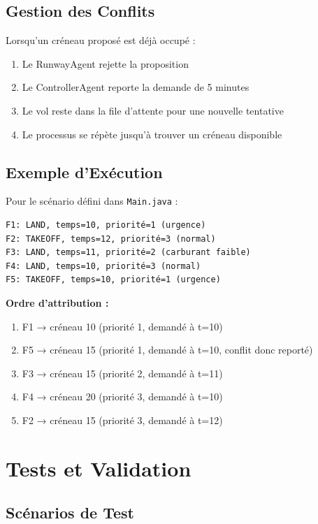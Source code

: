 \documentclass[12pt,a4paper]{article}
\begin{document}
\subsection{Gestion des Conflits}

Lorsqu'un créneau proposé est déjà occupé :
\begin{enumerate}
    \item Le RunwayAgent rejette la proposition
    \item Le ControllerAgent reporte la demande de 5 minutes
    \item Le vol reste dans la file d'attente pour une nouvelle tentative
    \item Le processus se répète jusqu'à trouver un créneau disponible
\end{enumerate}

\subsection{Exemple d'Exécution}

Pour le scénario défini dans \texttt{Main.java} :

\begin{verbatim}
F1: LAND, temps=10, priorité=1 (urgence)
F2: TAKEOFF, temps=12, priorité=3 (normal)
F3: LAND, temps=11, priorité=2 (carburant faible)
F4: LAND, temps=10, priorité=3 (normal)
F5: TAKEOFF, temps=10, priorité=1 (urgence)
\end{verbatim}

\textbf{Ordre d'attribution :}
\begin{enumerate}
    \item F1 → créneau 10 (priorité 1, demandé à t=10)
    \item F5 → créneau 15 (priorité 1, demandé à t=10, conflit donc reporté)
    \item F3 → créneau 15 (priorité 2, demandé à t=11)
    \item F4 → créneau 20 (priorité 3, demandé à t=10)
    \item F2 → créneau 15 (priorité 3, demandé à t=12)
\end{enumerate}

\section{Tests et Validation}

\subsection{Scénarios de Test}
\end{document}
